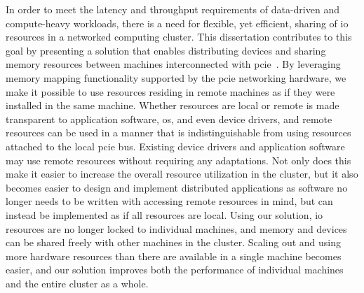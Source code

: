 In order to meet the latency and throughput requirements of data-driven and compute-heavy workloads, there is a need for flexible, yet efficient, sharing of \gls{io} resources in a networked computing cluster.
%
This dissertation contributes to this goal by presenting a solution that enables distributing devices and sharing memory resources between machines interconnected with \gls{pcie}~\cite{spec:PCIe}.
%
By leveraging memory mapping functionality supported by the \gls{pcie} networking hardware, we make it possible to use resources residing in remote machines as if they were installed in the same machine.
%
Whether resources are local or remote is made transparent to application software, \gls{os}, and even device drivers, and remote resources can be used in a manner that is indistinguishable from using resources attached to the local \gls{pcie} bus.
%
Existing device drivers and application software may use remote resources without requiring any adaptations.
%
Not only does this make it easier to increase the overall resource utilization in the cluster, but it also becomes easier to design and implement distributed applications as software no longer needs to be written with accessing remote resources in mind,
but can instead be implemented as if all resources are local.
%
Using our solution, \gls{io} resources are no longer locked to individual machines, and memory and devices can be shared freely with other machines in the cluster.
%
Scaling out and using more hardware resources than there are available in a single machine becomes easier, and our solution improves both the performance of individual machines and the entire cluster as a whole.



